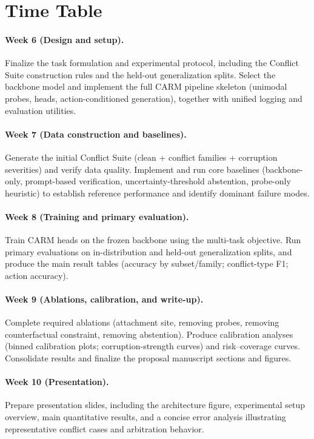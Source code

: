 \documentclass{article}
\begin{document}
\section{Time Table}
\label{sec:timetable}

\paragraph{Week 6 (Design and setup).}
Finalize the task formulation and experimental protocol, including the Conflict Suite construction rules and the held-out generalization splits. Select the backbone model and implement the full CARM pipeline skeleton (unimodal probes, heads, action-conditioned generation), together with unified logging and evaluation utilities.

\paragraph{Week 7 (Data construction and baselines).}
Generate the initial Conflict Suite (clean + conflict families + corruption severities) and verify data quality. Implement and run core baselines (backbone-only, prompt-based verification, uncertainty-threshold abstention, probe-only heuristic) to establish reference performance and identify dominant failure modes.

\paragraph{Week 8 (Training and primary evaluation).}
Train CARM heads on the frozen backbone using the multi-task objective. Run primary evaluations on in-distribution and held-out generalization splits, and produce the main result tables (accuracy by subset/family; conflict-type F1; action accuracy).

\paragraph{Week 9 (Ablations, calibration, and write-up).}
Complete required ablations (attachment site, removing probes, removing counterfactual constraint, removing abstention). Produce calibration analyses (binned calibration plots; corruption-strength curves) and risk--coverage curves. Consolidate results and finalize the proposal manuscript sections and figures.

\paragraph{Week 10 (Presentation).}
Prepare presentation slides, including the architecture figure, experimental setup overview, main quantitative results, and a concise error analysis illustrating representative conflict cases and arbitration behavior.
\end{document}
